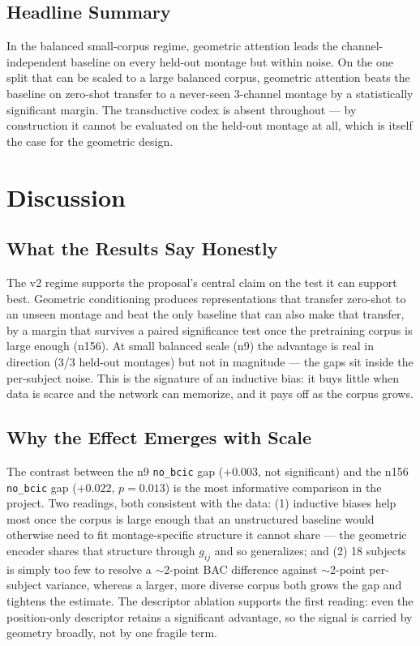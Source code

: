\documentclass[11pt]{article}
\begin{document}
\subsection{Headline Summary}
\label{sec:results:summary}

In the balanced small-corpus regime, geometric attention leads the
channel-independent baseline on every held-out montage but within noise. On
the one split that can be scaled to a large balanced corpus, geometric
attention beats the baseline on zero-shot transfer to a never-seen 3-channel
montage by a statistically significant margin. The transductive codex is
absent throughout --- by construction it cannot be evaluated on the held-out
montage at all, which is itself the case for the geometric design.

\section{Discussion}
\label{sec:discussion}

\subsection{What the Results Say Honestly}
The v2 regime supports the proposal's central claim on the test it can
support best. Geometric conditioning produces representations that transfer
zero-shot to an unseen montage and beat the only baseline that can also make
that transfer, by a margin that survives a paired significance test once the
pretraining corpus is large enough (n156). At small balanced scale (n9) the
advantage is real in direction (3/3 held-out montages) but not in magnitude
--- the gaps sit inside the per-subject noise. This is the signature of an
inductive bias: it buys little when data is scarce and the network can
memorize, and it pays off as the corpus grows.

\subsection{Why the Effect Emerges with Scale}
The contrast between the n9 \texttt{no\_bcic} gap ($+0.003$, not significant)
and the n156 \texttt{no\_bcic} gap ($+0.022$, $p = 0.013$) is the most
informative comparison in the project. Two readings, both consistent with the
data: (1) inductive biases help most once the corpus is large enough that an
unstructured baseline would otherwise need to fit montage-specific structure
it cannot share --- the geometric encoder shares that structure through
$g_{ij}$ and so generalizes; and (2) 18 subjects is simply too few to resolve
a $\sim$2-point BAC difference against $\sim$2-point per-subject variance,
whereas a larger, more diverse corpus both grows the gap and tightens the
estimate. The descriptor ablation supports the first reading: even the
position-only descriptor retains a significant advantage, so the signal is
carried by geometry broadly, not by one fragile term.
\end{document}
